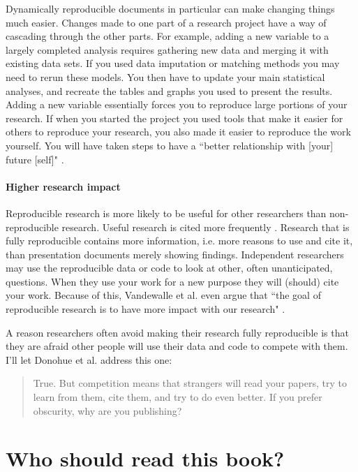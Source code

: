 \documentclass[krantz1]{krantz}
\begin{document}
Dynamically reproducible documents in particular can make changing things much easier. Changes made to one part of a research project have a way of cascading through the other parts. For example, adding a new variable to a largely completed analysis requires gathering new data and merging it with existing data sets. If you used data imputation or matching methods you may need to rerun these models. You then have to update your main statistical analyses, and recreate the tables and graphs you used to present the results. Adding a new variable essentially forces you to reproduce large portions of your research. If when you started the project you used tools that make it easier for others to reproduce your research, you also made it easier to reproduce the work yourself. You will have taken steps to have a ``better relationship with [your] future [self]" \cite[]{Bowers2011}.

\paragraph{Higher research impact}
Reproducible research is more likely to be useful for other researchers than non-reproducible research. Useful research is cited more frequently \cite[]{Donohue2002,Piwowar2007,Vandewalle2012}. Research that is fully reproducible contains more information, i.e. more reasons to use and cite it, than presentation documents merely showing findings. Independent researchers may use the reproducible data or code to look at other, often unanticipated, questions. When they use your work for a new purpose they will (should) cite your work. Because of this, Vandewalle et al. even argue that ``the goal of reproducible research is to have more impact with our research"  \citeyearpar[1253]{Vandewalle2007}.

A reason researchers often avoid making their research fully reproducible is that they are afraid other people will use their data and code to compete with them. I'll let Donohue et al. address this one:

\begin{quote}
    True. But competition means that strangers will read your papers, try to learn from them, cite them, and try to do even better. If you prefer obscurity, why are you publishing? \citeyearpar[16]{Donohue2009}
\end{quote}

\section{Who should read this book?}
\end{document}
